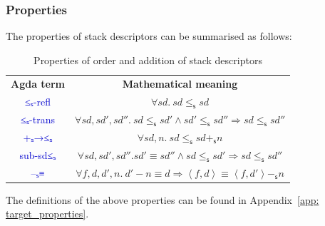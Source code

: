 \documentclass[12pt,a4paper]{report}
\theoremstyle{definition}
\newcommand{\mb}[1]{\textcolor{mediumblue}{#1}}
\newcommand{\mbt}[1]{\mb{\textsf{#1}}}
\newcommand{\ang}[1]{\left\langle #1 \right\rangle}
\begin{document}
    \subsubsection{Properties}
    The properties of stack descriptors can be summarised as follows:
    \begin{table}[H]
        \centering
        \begin{tabular}{|c|c|}
            \hline
            \textbf{Agda term} & \textbf{Mathematical meaning} \\
            \hhline{|=|=|}
            \mbt{≤ₛ-refl} & $\forall sd.\ sd \leq_\mathsf{s} sd$ \\
            \hline
            \mbt{≤ₛ-trans} & $\forall sd, sd', sd''.\ sd \leq_\mathsf{s} sd' \land sd' \leq_\mathsf{s} sd'' \Rightarrow sd \leq_\mathsf{s} sd''$ \\
            \hline
            \mbt{+ₛ→≤ₛ} & $\forall sd, n.\ sd \leq_\mathsf{s} sd +_\mathsf{s} n$ \\
            \hline
            \mbt{sub-sd≤ₛ} & $\forall sd, sd', sd''. sd' \equiv sd'' \land sd \leq_\mathsf{s} sd' \Rightarrow sd \leq_\mathsf{s} sd''$ \\
            \hline
            \mbt{–ₛ≡} & $\forall f, d, d′, n.\ d′ - n \equiv d \Rightarrow \ang{f, d} \equiv \ang{f, d′} -_\mathsf{s} n$ \\
            \hline
        \end{tabular}
        \caption{Properties of order and addition of stack descriptors}
        \label{tab: stack_descriptor_properties}
    \end{table}
    The definitions of the above properties can be found in Appendix~\ref{app: target_properties}.
\end{document}
